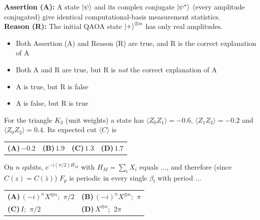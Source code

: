 \documentclass[11pt,a4paper]{article}
\newcommand{\optlabel}[1]{\textbf{(#1)}}
\newenvironment{qitem}[1]{\begin{list}{}{\setlength{\leftmargin}{3.3em}\setlength{\labelwidth}{3.1em}%
  \setlength{\labelsep}{0.2em}\setlength{\topsep}{3pt}\setlength{\parsep}{3pt}}\item[\textbf{Q.#1}\hfill]}{\end{list}}
\newcommand{\qsep}{\par\vspace{2pt}{\color{black!15}\hrule}\vspace{4pt}}
\begin{document}
\begin{qitem}{35}
\textbf{Assertion (A):} A state $\ket\psi$ and its complex conjugate $\ket{\psi^*}$ (every amplitude conjugated) give
identical computational-basis measurement statistics.\\[1mm]
\textbf{Reason (R):} The initial QAOA state $\ket{+}^{\otimes n}$ has only real amplitudes.
\begin{itemize}[leftmargin=2.6em, labelsep=0.4em, itemsep=2pt, topsep=3pt]
\item[\optlabel{A}] Both Assertion (A) and Reason (R) are true, and R is the correct explanation of A
\item[\optlabel{B}] Both A and R are true, but R is \emph{not} the correct explanation of A
\item[\optlabel{C}] A is true, but R is false
\item[\optlabel{D}] A is false, but R is true
\end{itemize}
\end{qitem}
\qsep

\begin{qitem}{36}
For the triangle $K_3$ (unit weights) a state has $\langle Z_0Z_1\rangle = -0.6$, $\langle Z_1Z_2\rangle = -0.2$ and
$\langle Z_0Z_2\rangle = 0.4$. Its expected cut $\langle C\rangle$ is
\par\smallskip\noindent\begin{tabularx}{\linewidth}{@{}*{4}{L}@{}}
\optlabel{A}\,$-0.2$ & \optlabel{B}\,$1.9$ & \optlabel{C}\,$1.3$ & \optlabel{D}\,$1.7$
\end{tabularx}
\end{qitem}
\qsep

\begin{qitem}{37}
On $n$ qubits, $e^{-i(\pi/2) H_M}$ with $H_M = \sum_i X_i$ equals ..., and therefore (since $C(z) = C(\bar z)$) $F_p$ is
periodic in every single $\beta_l$ with period ...
\par\smallskip\noindent\begin{tabularx}{\linewidth}{@{}*{2}{L}@{}}
\optlabel{A}\,$(-i)^n X^{\otimes n}$; $\ \pi/2$ & \optlabel{B}\,$(-i)^n X^{\otimes n}$; $\ \pi$ \\[3pt]
\optlabel{C}\,$I$; $\ \pi/2$ & \optlabel{D}\,$X^{\otimes n}$; $\ 2\pi$
\end{tabularx}
\end{qitem}
\qsep
\end{document}
